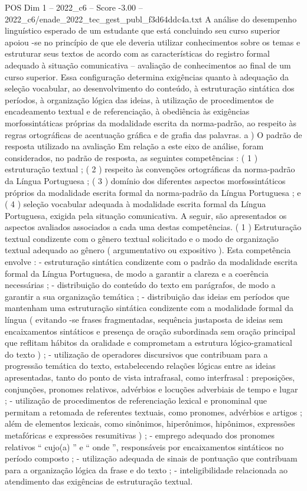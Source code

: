 \begin{textsample}{POS Dim 1 – 2022\_c6 – Score -3.00 – 2022\_c6/enade\_2022\_tec\_gest\_publ\_f3d64ddc4a.txt}
A análise do desempenho linguístico esperado de um estudante que está concluindo seu curso superior apoiou -se no princípio de que ele deveria utilizar conhecimentos sobre os temas e estruturar seus textos de acordo com as características do registro formal adequado à situação comunicativa – avaliação de conhecimentos ao final de um curso superior.
Essa configuração determina exigências quanto à adequação da seleção vocabular, ao desenvolvimento do conteúdo, à estruturação sintática dos períodos, à organização lógica das ideias, à utilização de procedimentos de encadeamento textual e de referenciação, à obediência às exigências morfossintáticas próprias da modalidade escrita da norma-padrão, ao respeito às regras ortográficas de acentuação gráfica e de grafia das palavras. a ) O padrão de resposta utilizado na avaliação Em relação a este eixo de análise, foram considerados, no padrão de resposta, as seguintes competências : ( 1 ) estruturação textual ; ( 2 ) respeito às convenções ortográficas da norma-padrão da Língua Portuguesa ; ( 3 ) domínio dos diferentes aspectos morfossintáticos próprios da modalidade escrita formal da norma-padrão da Língua Portuguesa ; e ( 4 ) seleção vocabular adequada à modalidade escrita formal da Língua Portuguesa, exigida pela situação comunicativa.
A seguir, são apresentados os aspectos avaliados associados a cada uma destas competências. ( 1 ) Estruturação textual condizente com o gênero textual solicitado e o modo de organização textual adequado ao gênero ( argumentativo ou expositivo ).
Esta competência envolve : - estruturação sintática condizente com o padrão da modalidade escrita formal da Língua Portuguesa, de modo a garantir a clareza e a coerência necessárias ; - distribuição do conteúdo do texto em parágrafos, de modo a garantir a sua organização temática ; - distribuição das ideias em períodos que mantenham uma estruturação sintática condizente com a modalidade formal da língua ( evitando -se frases fragmentadas, sequência justaposta de ideias sem encaixamentos sintáticos e presença de oração subordinada sem oração principal que reflitam hábitos da oralidade e comprometam a estrutura lógico-gramatical do texto ) ; - utilização de operadores discursivos que contribuam para a progressão temática do texto, estabelecendo relações lógicas entre as ideias apresentadas, tanto do ponto de vista intrafrasal, como interfrasal : preposições, conjunções, pronomes relativos, advérbios e locuções adverbiais de tempo e lugar ; - utilização de procedimentos de referenciação lexical e pronominal que permitam a retomada de referentes textuais, como pronomes, advérbios e artigos ; além de elementos lexicais, como sinônimos, hiperônimos, hipônimos, expressões metafóricas e expressões resumitivas ) ; - emprego adequado dos pronomes relativos “ cujo(a) ” e “ onde ”, responsáveis por encaixamentos sintáticos no período composto ; - utilização adequada de sinais de pontuação que contribuam para a organização lógica da frase e do texto ; - inteligibilidade relacionada ao atendimento das exigências de estruturação textual.

\end{textsample}
